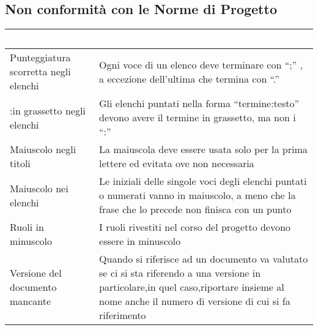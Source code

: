 \subsection{Non conformità con le Norme di Progetto}
{
    \setlength{\freewidth}{\dimexpr\textwidth-10\tabcolsep}
    \renewcommand{\arraystretch}{1.5}
    \centering
    \setlength{\aboverulesep}{0pt}
    \setlength{\belowrulesep}{0pt}
    \begin{longtable}{C{.5\freewidth} C{.5\freewidth}}
       \toprule
    \textcolor{white}{\textbf{Aspetto}}&
    \textcolor{white}{\textbf{Spiegazione}} \\
    \toprule
    \endhead
    Punteggiatura scorretta negli elenchi & Ogni voce di un elenco deve terminare con “;” , a eccezione dell'ultima che termina con “.” \\
    :in grassetto negli elenchi & Gli elenchi puntati nella forma “termine:testo” devono avere il termine in grassetto, ma non i “:” \\
    Maiuscolo negli titoli & La maiuscola deve essere usata solo per la prima lettere ed evitata ove non necessaria \\
    Maiuscolo nei elenchi & Le iniziali delle singole voci degli elenchi puntati o numerati vanno in maiuscolo, a meno che la frase che lo precede non finisca con un punto \\
    Ruoli in minuscolo & I ruoli rivestiti nel corso del progetto devono essere in minuscolo \\
    Versione del documento mancante & Quando si riferisce ad un documento va valutato se ci si sta riferendo a una versione in particolare,in quel caso,riportare insieme al nome anche il numero di versione di cui si fa riferimento\\
    
    \bottomrule
\end{longtable}
}
